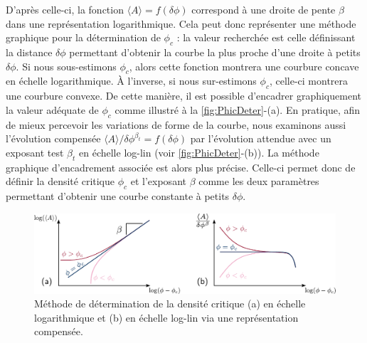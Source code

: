 \noindent D'après celle-ci, la fonction $\langle A \rangle = f(\delta\phi)$ correspond à une droite de pente $\beta$ dans une représentation logarithmique. Cela peut donc représenter une méthode graphique pour la détermination de $\phi_c$ : la valeur recherchée est celle définissant la distance $\delta\phi$ permettant d'obtenir la courbe la plus proche d'une droite à petits $\delta\phi$. Si nous sous-estimons $\phi_c$, alors cette fonction montrera une courbure concave en échelle logarithmique. \`A l'inverse, si nous sur-estimons $\phi_c$, celle-ci montrera une courbure convexe. De cette manière, il est possible d'encadrer graphiquement la valeur adéquate de $\phi_c$ comme illustré à la \autoref{fig:PhicDeter}-(a). En pratique, afin de mieux percevoir les variations de forme de la courbe, nous examinons aussi l'évolution compensée $\langle A \rangle/\delta\phi^{\beta_t} = f(\delta\phi)$ par l'évolution attendue avec un exposant test $\beta_t$ en échelle log-lin (voir \autoref{fig:PhicDeter}-(b)). La méthode graphique d'encadrement associée est alors plus précise. Celle-ci permet donc de définir la densité critique $\phi_c$ et l'exposant $\beta$ comme les deux paramètres permettant d'obtenir une courbe constante à petits $\delta\phi$.

\begin{figure}[h]
	\centering
	\includegraphics[width=\textwidth]{Chapitre2/Figures/Methodes/Phic.pdf}
	\caption{Méthode de détermination de la densité critique (a) en échelle logarithmique et (b) en échelle log-lin via une représentation compensée.}
	\label{fig:PhicDeter}
\end{figure}

